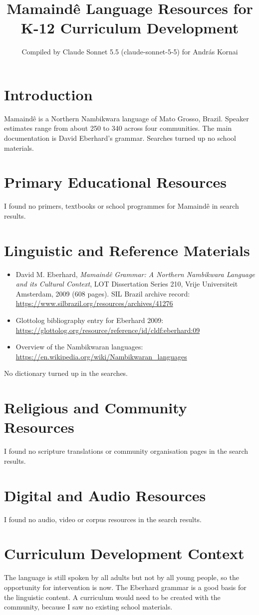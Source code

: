 \documentclass[12pt]{article}
\title{Mamaind\^e Language Resources for K-12 Curriculum Development}
\author{Compiled by Claude Sonnet 5.5 (claude-sonnet-5-5) for Andr\'as Kornai}
\date{}
\begin{document}
\maketitle

\section{Introduction}
Mamaind\^e is a Northern Nambikwara language of Mato Grosso, Brazil. Speaker estimates range from about 250 to 340 across four communities. The main documentation is David Eberhard's grammar. Searches turned up no school materials.

\section{Primary Educational Resources}
I found no primers, textbooks or school programmes for Mamaind\^e in search results.

\section{Linguistic and Reference Materials}
\begin{itemize}
\item David M. Eberhard, \emph{Mamaind\^e Grammar: A Northern Nambikwara Language and its Cultural Context}, LOT Dissertation Series 210, Vrije Universiteit Amsterdam, 2009 (608 pages). SIL Brazil archive record: \url{https://www.silbrazil.org/resources/archives/41276}
\item Glottolog bibliography entry for Eberhard 2009: \url{https://glottolog.org/resource/reference/id/cldf:eberhard:09}
\item Overview of the Nambikwaran languages: \url{https://en.wikipedia.org/wiki/Nambikwaran_languages}
\end{itemize}
No dictionary turned up in the searches.

\section{Religious and Community Resources}
I found no scripture translations or community organisation pages in the search results.

\section{Digital and Audio Resources}
I found no audio, video or corpus resources in the search results.

\section{Curriculum Development Context}
The language is still spoken by all adults but not by all young people, so the opportunity for intervention is now. The Eberhard grammar is a good basis for the linguistic content. A curriculum would need to be created with the community, because I saw no existing school materials.
\end{document}
